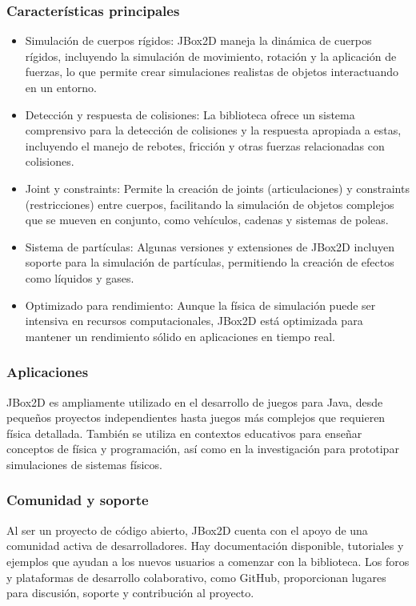 \subsubsection{Características principales}
\begin{itemize}
    \item Simulación de cuerpos rígidos: JBox2D maneja la dinámica de cuerpos rígidos, incluyendo la simulación de movimiento, rotación y la aplicación de fuerzas, lo que permite crear simulaciones realistas de objetos interactuando en un entorno.
    \item Detección y respuesta de colisiones: La biblioteca ofrece un sistema comprensivo para la detección de colisiones y la respuesta apropiada a estas, incluyendo el manejo de rebotes, fricción y otras fuerzas relacionadas con colisiones.
    \item Joint y constraints: Permite la creación de joints (articulaciones) y constraints (restricciones) entre cuerpos, facilitando la simulación de objetos complejos que se mueven en conjunto, como vehículos, cadenas y sistemas de poleas.
    \item Sistema de partículas: Algunas versiones y extensiones de JBox2D incluyen soporte para la simulación de partículas, permitiendo la creación de efectos como líquidos y gases.
    \item Optimizado para rendimiento: Aunque la física de simulación puede ser intensiva en recursos computacionales, JBox2D está optimizada para mantener un rendimiento sólido en aplicaciones en tiempo real.
\end{itemize}
\subsubsection{Aplicaciones}
JBox2D es ampliamente utilizado en el desarrollo de juegos para Java, desde pequeños proyectos independientes hasta juegos más complejos que requieren física detallada. También se utiliza en contextos educativos para enseñar conceptos de física y programación, así como en la investigación para prototipar simulaciones de sistemas físicos.
\subsubsection{Comunidad y soporte}
Al ser un proyecto de código abierto, JBox2D cuenta con el apoyo de una comunidad activa de desarrolladores. Hay documentación disponible, tutoriales y ejemplos que ayudan a los nuevos usuarios a comenzar con la biblioteca. Los foros y plataformas de desarrollo colaborativo, como GitHub, proporcionan lugares para discusión, soporte y contribución al proyecto.


